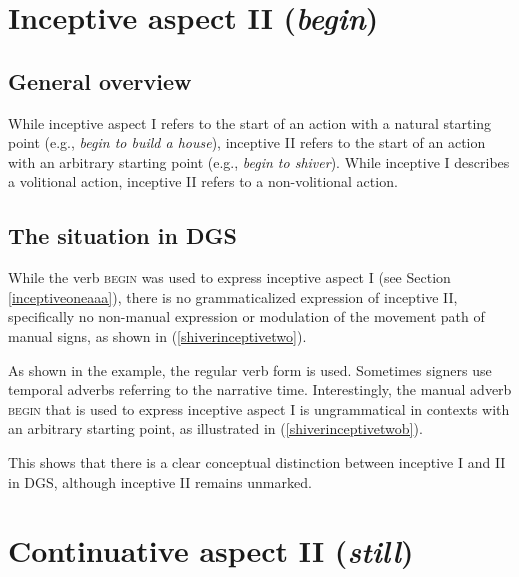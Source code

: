 

\section{Inceptive aspect II (\textit{begin})}\label{inceptivetwo}
\subsection{General overview}

While inceptive aspect I refers to the start of an action with a natural starting point (e.g., \textit{begin to build a house}), inceptive II refers to the start of an action with an arbitrary starting point (e.g., \textit{begin to shiver}). While inceptive I describes a volitional action, inceptive II refers to a non-volitional action.

\subsection{The situation in DGS}
While the verb \textsc{begin} was used to express inceptive aspect I (see Section \ref{inceptiveoneaaa}), there is no grammaticalized expression of inceptive II, specifically no non-manual expression or modulation of the movement path of manual signs, as shown in (\ref{shiverinceptivetwo}).

\begin{exe}
\end{exe}

\noindent As shown in the example, the regular verb form is used. Sometimes signers use temporal adverbs referring to the narrative time. Interestingly, the manual adverb \textsc{begin} that is used to express inceptive aspect I is ungrammatical in contexts with an arbitrary starting point, as illustrated in (\ref{shiverinceptivetwob}).

\begin{exe}
\end{exe}

\noindent This shows that there is a clear conceptual distinction between inceptive I and II in DGS, although inceptive II remains unmarked.




\section{Continuative aspect II (\textit{still})}\label{continuativetwo}
